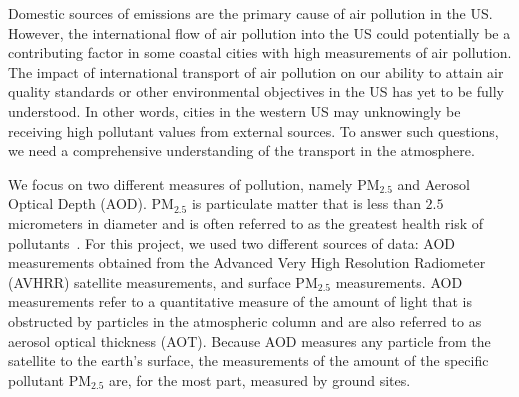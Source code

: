 \documentclass[10pt]{article}
\begin{document}
Domestic sources of emissions are the primary cause of air pollution in the
US. However, the international flow of air pollution into
the US could potentially be a contributing factor in some coastal cities with 
high measurements of air pollution. The impact of international transport of
air pollution on our ability to attain air quality standards or other
environmental objectives in the US has yet to be fully understood. In
other words, cities in the western US may unknowingly be receiving high
pollutant values from external sources. {To answer such questions, 
we need a comprehensive understanding of the transport in the
atmosphere.  
}



{We focus on two different measures of pollution, namely PM$_{2.5}$ and Aerosol
Optical Depth (AOD).} PM$_{2.5}$ is particulate matter that is less than $2.5$
micrometers in diameter and is often referred to as the greatest health risk of
pollutants~\cite{epa}. For this project, we used two different sources of data: 
{AOD} measurements obtained from the Advanced Very High Resolution
Radiometer (AVHRR) satellite measurements, and surface PM$_{2.5}$ measurements.
AOD measurements refer to a quantitative measure of the amount of light that is
obstructed by particles in the atmospheric column and are also referred to as
aerosol optical thickness (AOT). Because AOD measures any particle from the
satellite to the earth's surface, the measurements of the amount of the
specific pollutant PM$_{2.5}$ are, for the most part, measured by ground sites.
\end{document}
